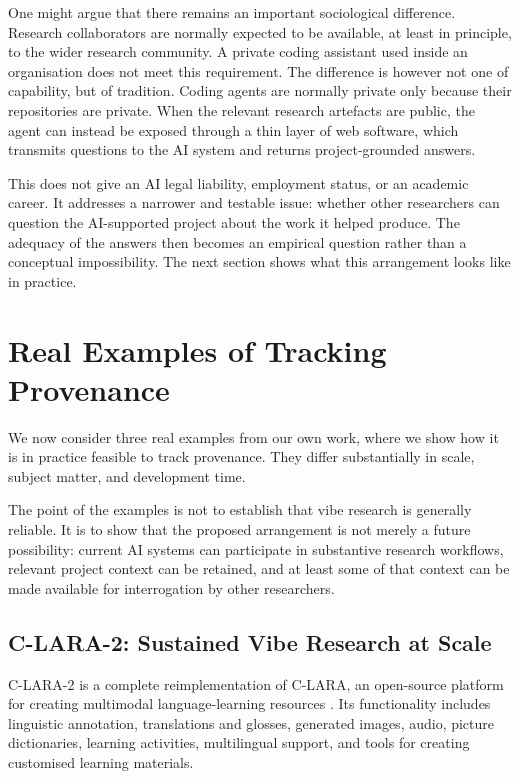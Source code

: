\documentclass[12pt]{article}
\begin{document}
One might argue that there remains an important sociological difference. Research collaborators are normally expected to be available, at least in principle, to the wider research community. A private coding assistant used inside an organisation does not meet this requirement. The difference is however not one of capability, but of tradition. Coding agents are normally private only because their repositories are private. When the relevant research artefacts are public, the agent can instead be exposed through a thin layer of web software, which transmits questions to the AI system and returns project-grounded answers.

This does not give an AI legal liability, employment status, or an academic career. It addresses a narrower and testable issue: whether other researchers can question the AI-supported project about the work it helped produce.
The adequacy of the answers then becomes an empirical question rather than a conceptual impossibility. The next section shows what this arrangement looks like in practice.


\section{Real Examples of Tracking Provenance}

We now consider three real examples from our own work, where we show how it is in practice feasible to track provenance. They differ substantially in scale, subject matter, and development time.

The point of the examples is not to establish that vibe research is generally reliable. It is to show that the proposed arrangement is not merely a future possibility: current AI systems can participate in substantive research workflows, relevant project context can be retained, and at least some of that context can be made available for interrogation by other researchers.

\subsection{C-LARA-2: Sustained Vibe Research at Scale}

C-LARA-2 is a complete reimplementation of C-LARA, an open-source platform for creating multimodal language-learning resources \citep{claraOriginal}. Its functionality includes linguistic annotation, translations and glosses, generated images, audio, picture dictionaries, learning activities, multilingual support, and tools for creating customised learning materials.
\end{document}
